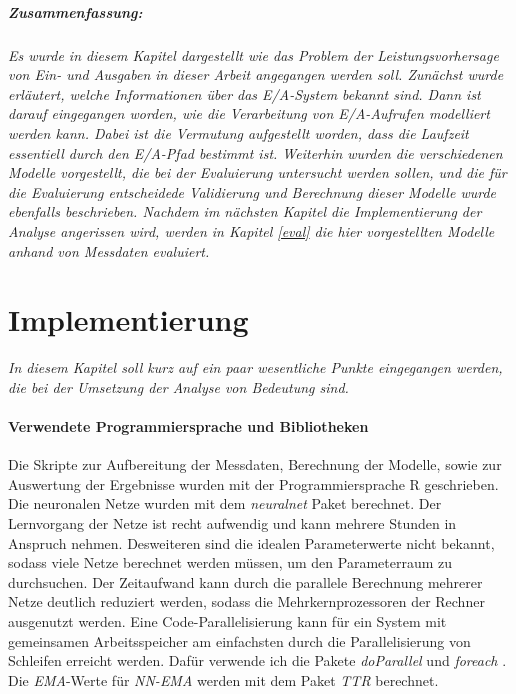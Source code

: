 \documentclass[
	twoside,
	12pt,
	a4paper,
	BCOR10mm,
	DIV14,
	listof=totoc,
	bibliography=totoc,
	headsepline
]{scrreprt}
\begin{document}
\paragraph{Zusammenfassung:}
\textit{
Es wurde in diesem Kapitel dargestellt wie das Problem der Leistungsvorhersage von Ein- und Ausgaben in dieser Arbeit angegangen werden soll.
Zunächst wurde erläutert, welche Informationen über das E/A-System bekannt sind. Dann ist darauf eingegangen worden, wie die Verarbeitung von E/A-Aufrufen modelliert werden kann. Dabei ist die Vermutung aufgestellt worden, dass die Laufzeit essentiell durch den E/A-Pfad bestimmt ist. 
Weiterhin wurden die verschiedenen Modelle vorgestellt, die bei der Evaluierung untersucht werden sollen, und die für die Evaluierung entscheidede Validierung und Berechnung dieser Modelle wurde ebenfalls beschrieben.
Nachdem im nächsten Kapitel die Implementierung der Analyse angerissen wird, werden in Kapitel \ref{eval} die hier vorgestellten Modelle anhand von Messdaten evaluiert.
}

\chapter{Implementierung}
\textit{%
In diesem Kapitel soll kurz auf ein paar wesentliche Punkte eingegangen werden, die bei der Umsetzung der Analyse von Bedeutung sind.
}
\bigskip

\subsubsection{Verwendete Programmiersprache und Bibliotheken}
Die Skripte zur Aufbereitung der Messdaten, Berechnung der Modelle, sowie zur Auswertung der Ergebnisse wurden mit der Programmiersprache R geschrieben.
Die neuronalen Netze wurden mit dem \textit{neuralnet} Paket \cite{gunther2010neuralnet} berechnet. Der Lernvorgang der Netze ist recht aufwendig und kann mehrere Stunden in Anspruch nehmen.
Desweiteren sind die idealen Parameterwerte nicht bekannt, sodass viele Netze berechnet werden müssen, um den Parameterraum zu durchsuchen.
Der Zeitaufwand kann durch die parallele Berechnung mehrerer Netze deutlich reduziert werden, sodass die Mehrkernprozessoren der Rechner ausgenutzt werden.
Eine Code-Parallelisierung kann für ein System mit gemeinsamen Arbeitsspeicher am einfachsten durch die Parallelisierung von Schleifen erreicht werden. Dafür verwende ich die Pakete \textit{doParallel} und \textit{foreach} \cite{weston2014getting}.
Die \textit{EMA}-Werte für \textit{NN-EMA} werden mit dem Paket \textit{TTR} berechnet.
\end{document}
